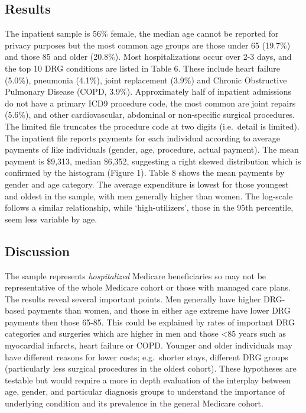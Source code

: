 \documentclass[]{article}
\begin{document}
\hypertarget{results}{%
\subsection{Results}\label{results}}

The inpatient sample is 56\% female, the median age cannot be reported
for privacy purposes but the most common age groups are those under 65
(19.7\%) and those 85 and older (20.8\%). Most hospitalizations occur
over 2-3 days, and the top 10 DRG conditions are listed in Table 6.
These include heart failure (5.0\%), pneumonia (4.1\%), joint
replacement (3.9\%) and Chronic Obstructive Pulmonary Disease (COPD,
3.9\%). Approximately half of inpatient admissions do not have a primary
ICD9 procedure code, the most common are joint repairs (5.6\%), and
other cardiovascular, abdominal or non-specific surgical procedures. The
limited file truncates the procedure code at two digits (i.e.~detail is
limited). The inpatient file reports payments for each individual
according to average payments of like individuals (gender, age,
procedure, actual payment). The mean payment is \$9,313, median \$6,352,
suggesting a right skewed distribution which is confirmed by the
histogram (Figure 1). Table 8 shows the mean payments by gender and age
category. The average expenditure is lowest for those youngest and
oldest in the sample, with men generally higher than women. The
log-scale follows a similar relationship, while `high-utilizers', those
in the 95th percentile, seem less variable by age.

\hypertarget{discussion}{%
\subsection{Discussion}\label{discussion}}

The sample represents \emph{hospitalized} Medicare beneficiaries so may
not be representative of the whole Medicare cohort or those with managed
care plans. The results reveal several important points. Men generally
have higher DRG-based payments than women, and those in either age
extreme have lower DRG payments then those 65-85. This could be
explained by rates of important DRG categories and surgeries which are
higher in men and those \textless{}85 years such as myocardial infarcts,
heart failure or COPD. Younger and older individuals may have different
reasons for lower costs; e.g.~shorter stays, different DRG groups
(particularly less surgical procedures in the oldest cohort). These
hypotheses are testable but would require a more in depth evaluation of
the interplay between age, gender, and particular diagnosis groups to
understand the importance of underlying condition and its prevalence in
the general Medicare cohort.
\end{document}
